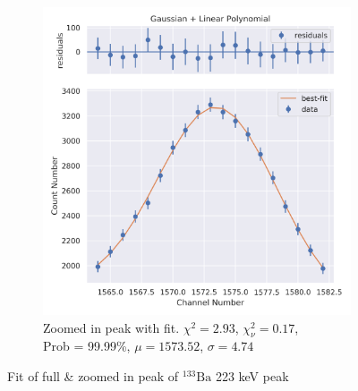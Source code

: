 \documentclass[11pt,a4paper]{article}
\newcommand{\element}[2]{$^{#2}\textrm{#1}$}
\begin{document}
\begin{figure}[H]
\begin{subfigure}{.5\linewidth}
    \includegraphics[width=\linewidth]{./Images/Barium133/Linear/Linear_3_Zoom.png}
    \caption{Zoomed in peak with fit. $\chi^2 = 2.93$, $\chi^2_\nu = 0.17$, \\ Prob = 99.99\%, $\mu = 1573.52$, $\sigma = 4.74$}
  \end{subfigure}
  \caption{Fit of full \& zoomed in peak of \element{Ba}{133} 223 keV peak}
\end{figure}
\end{document}
